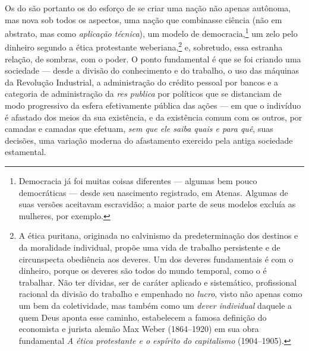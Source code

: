 Os  do  são portanto os  do esforço de se criar uma nação não
apenas autônoma, mas nova sob todos os aspectos, uma nação que
combinasse ciência (não em abstrato, mas como \emph{aplicação técnica}),
um modelo de democracia,\footnote{Democracia já foi muitas coisas
  diferentes --- algumas bem pouco democráticas --- desde seu nascimento
  registrado, em Atenas. Algumas de suas versões aceitavam escravidão; a
  maior parte de seus modelos excluía as mulheres, por exemplo.} um
zelo pelo dinheiro segundo a ética protestante weberiana,\footnote{A
  ética puritana, originada no calvinismo da predeterminação dos
  destinos e da moralidade individual, propõe uma vida de trabalho
  persistente e de circunspecta obediência aos deveres. Um dos deveres
  fundamentais é com o dinheiro, porque os deveres são todos do mundo
  temporal, como o é trabalhar. Não ter dívidas, ser de caráter aplicado
  e sistemático, profissional racional da divisão do trabalho e
  empenhado no \emph{lucro}, visto não apenas como um bem da
  coletividade, mas também como um \emph{dever individual} daquele a
  quem Deus aponta esse caminho, estabelecem a famosa definição do
  economista e jurista alemão Max Weber (1864--1920) em sua obra
  fundamental \emph{A ética protestante e o espírito do capitalismo}
  (1904--1905).} e, sobretudo, essa estranha relação, de sombras, com o
poder. O ponto fundamental é que se foi criando uma sociedade --- desde
a divisão do conhecimento e do trabalho, o uso das máquinas da Revolução
Industrial, a administração do crédito pessoal por bancos e a categoria
de administração da \emph{res publica} por políticos que se distanciam
de modo progressivo da esfera efetivamente pública das ações --- em que
o indivíduo é afastado dos meios da sua existência, e da existência
comum com os outros, por camadas e camadas que efetuam, \emph{sem que
ele saiba quais e para quê}, suas decisões, uma variação moderna do
afastamento exercido pela antiga sociedade estamental.

